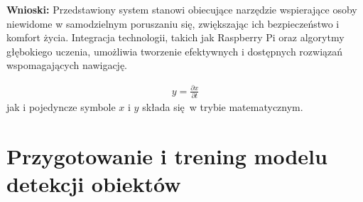 \documentclass[a4paper,twoside,12pt]{book}
\newtheorem{Definition}{Definicja}
\newtheorem{Example}{Przykład}
\newtheorem{Theorem}{Twierdzenie}
\begin{document}
\textbf{Wnioski:}
Przedstawiony system stanowi obiecujące narzędzie wspierające osoby niewidome w samodzielnym poruszaniu się, zwiększając ich bezpieczeństwo i komfort życia. Integracja technologii, takich jak Raspberry Pi oraz algorytmy głębokiego uczenia, umożliwia tworzenie efektywnych i dostępnych rozwiązań wspomagających nawigację.






\begin{align}
y = \frac{\partial x}{\partial t}
\end{align}
jak i pojedyncze symbole $x$ i $y$  składa się w trybie matematycznym.


%
%





\chapter{Przygotowanie i trening modelu detekcji obiektów}
\label{ch:Przygotowanie-i-trening-modelu}
\end{document}
